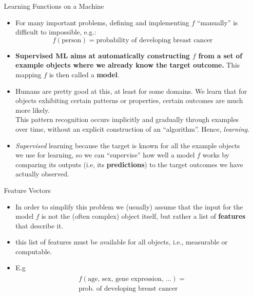 \documentclass[11pt,compress,t,notes=noshow, xcolor=table]{beamer}
\begin{document}
\begin{vbframe}{Learning Functions on a Machine}
\begin{itemize}
\item For many important problems, defining and implementing $f$ \enquote{manually} is difficult to impossible, e.g.:
$$f(\textrm{person}) = \textrm{probability of developing breast cancer}$$
\item \textbf{Supervised ML aims at automatically constructing $f$ from a set of example objects where we already know the target outcome.}  This mapping $f$ is then called a \textbf{model}.
\item Humans are pretty good at this, at least for some domains. We learn that for objects exhibiting certain  patterns or properties, certain outcomes are much more likely.\\
This pattern recognition occurs implicitly and gradually through examples over time, without an explicit construction of an \enquote{algorithm}. Hence, \emph{learning}. 
\item \emph{Supervised} learning because the target is known for all the example objects we use for learning, so we can \enquote{supervise} how well a model $f$ works by comparing its outputs (i.e, its \textbf{predictions}) to the target outcomes we have actually observed.
\end{itemize}
\end{vbframe}

\begin{vbframe}{Feature Vectors}

\begin{itemize}
\item In order to simplify this problem we (usually) assume that the input for the model $f$ 
is not the (often complex) object itself, but rather a list of \textbf{features} that describe it.
\item this list of features must be available for all objects, i.e., measurable or computable.
\item E.g
\begin{align*}
\begin{split}
  f(\textrm{age, sex, gene expression, ...}) =\\
   \textrm{prob. of developing breast cancer}
\end{split}
\end{align*}
\end{itemize}

\end{vbframe}
\end{document}
